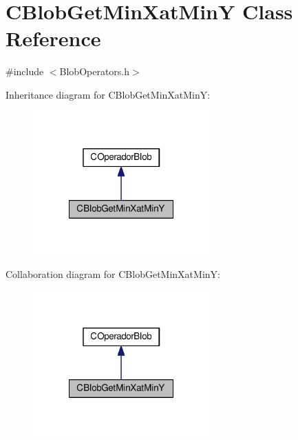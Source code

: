 \hypertarget{classCBlobGetMinXatMinY}{\section{C\-Blob\-Get\-Min\-Xat\-Min\-Y Class Reference}
\label{classCBlobGetMinXatMinY}
}


{\ttfamily \#include $<$Blob\-Operators.\-h$>$}



Inheritance diagram for C\-Blob\-Get\-Min\-Xat\-Min\-Y\-:\nopagebreak
\begin{figure}[H]
\begin{center}
\leavevmode
\includegraphics[width=192pt]{classCBlobGetMinXatMinY__inherit__graph}
\end{center}
\end{figure}


Collaboration diagram for C\-Blob\-Get\-Min\-Xat\-Min\-Y\-:\nopagebreak
\begin{figure}[H]
\begin{center}
\leavevmode
\includegraphics[width=192pt]{classCBlobGetMinXatMinY__coll__graph}
\end{center}
\end{figure}
